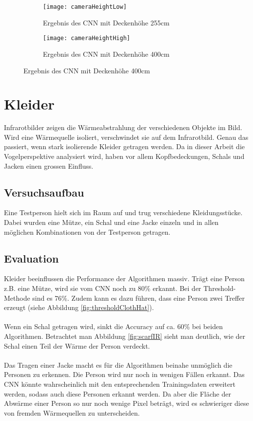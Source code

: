 \begin{figure}[H]
	\begin{subfigure}{.45\linewidth}
		\centering
		\texttt{[image: cameraHeightLow]}
		\caption{Ergebnis des \gls{CNN} mit Deckenhöhe 255cm}
		\label{fig:cameraHeightLow}
	\end{subfigure}
	\begin{subfigure}{.45\linewidth}
		\centering
		\texttt{[image: cameraHeightHigh]}
		\caption{Ergebnis des \gls{CNN} mit Deckenhöhe 400cm}
		\label{fig:cameraHeightHigh}
	\end{subfigure}
\end{figure}


\section{Kleider}
\label{sec:cloths}

Infrarotbilder zeigen die Wärmeabstrahlung der verschiedenen Objekte im Bild. Wird eine Wärmequelle isoliert, verschwindet sie auf dem Infrarotbild. Genau das passiert, wenn stark isolierende Kleider getragen werden. Da in dieser Arbeit die Vogelperspektive analysiert wird, haben vor allem Kopfbedeckungen, Schals und Jacken einen grossen Einfluss. 

\subsection{Versuchsaufbau}

Eine Testperson hielt sich im Raum auf und trug verschiedene Kleidungsstücke. Dabei wurden eine Mütze, ein Schal und eine Jacke einzeln und in allen möglichen Kombinationen von der Testperson getragen.

\subsection{Evaluation}
Kleider beeinflussen die Performance der Algorithmen massiv. Trägt eine Person z.B. eine Mütze, wird sie vom \gls{CNN} noch zu 80\% erkannt. Bei der Threshold-Methode sind es 76\%. Zudem kann es dazu führen, dass eine Person zwei Treffer erzeugt (siehe Abbildung \ref{fig:thresholdClothHat}).\\
\\
Wenn ein Schal getragen wird, sinkt die Accuracy auf ca. 60\% bei beiden Algorithmen. Betrachtet man Abbildung \ref{fig:scarfIR} sieht man deutlich, wie der Schal einen Teil der Wärme der Person verdeckt.\\
\\
Das Tragen einer Jacke macht es für die Algorithmen beinahe unmöglich die Personen zu erkennen. Die Person wird nur noch in wenigen Fällen erkannt. Das \gls{CNN} könnte wahrscheinlich mit den entsprechenden Trainingsdaten erweitert werden, sodass auch diese Personen erkannt werden. Da aber die Fläche der Abwärme einer Person so nur noch wenige Pixel beträgt, wird es schwieriger diese von fremden Wärmequellen zu unterscheiden.\\

